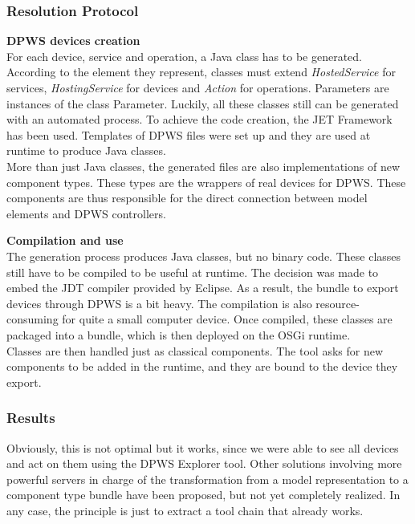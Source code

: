 \subsubsection{Resolution Protocol}

{\bf DPWS devices creation}\\
For each device, service and operation, a Java class has to be generated. According to the element they represent, classes must extend {\it HostedService} for services, {\it HostingService} for devices and {\it Action} for operations. Parameters are instances of the class \textsf{Parameter}. Luckily, all these classes still can be generated with an automated process. To achieve the code creation, the JET Framework has been used. Templates of DPWS files were set up and they are used at runtime to produce Java classes.\\
More than just Java classes, the generated files are also implementations of new component types. These types are the wrappers of real devices for DPWS. These components are thus responsible for the direct connection between model elements and DPWS controllers.

{\bf Compilation and use}\\
The generation process produces Java classes, but no binary code. These classes still have to be compiled to be useful at runtime. The decision was made to embed the JDT compiler provided by Eclipse. As a result, the bundle to export devices through DPWS is a bit heavy. The compilation is also resource-consuming for quite a small computer device. Once compiled, these classes are packaged into a bundle, which is then deployed on the OSGi runtime.\\
Classes are then handled just as classical components. The tool asks for new components to be added in the runtime, and they are bound to the device  they export.\\

\subsubsection{Results}

Obviously, this is not optimal but it works, since we were able to see all devices and act on them using the DPWS Explorer tool. Other solutions involving more powerful servers in charge of the transformation from a model representation to a component type bundle have been proposed, but not yet completely realized. In any case, the principle is just to extract a tool chain that already works.\\


